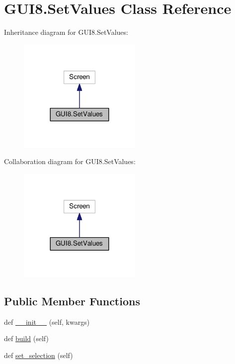 \hypertarget{classGUI8_1_1SetValues}{}\section{G\+U\+I8.\+Set\+Values Class Reference}
\label{classGUI8_1_1SetValues}


Inheritance diagram for G\+U\+I8.\+Set\+Values\+:
\nopagebreak
\begin{figure}[H]
\begin{center}
\leavevmode
\includegraphics[width=168pt]{classGUI8_1_1SetValues__inherit__graph}
\end{center}
\end{figure}


Collaboration diagram for G\+U\+I8.\+Set\+Values\+:
\nopagebreak
\begin{figure}[H]
\begin{center}
\leavevmode
\includegraphics[width=168pt]{classGUI8_1_1SetValues__coll__graph}
\end{center}
\end{figure}
\subsection*{Public Member Functions}
\begin{DoxyCompactItemize}
\item 
def \hyperlink{classGUI8_1_1SetValues_a92fd466efdfd6e4cfbd6f88f5e0eaac3}{\+\_\+\+\_\+init\+\_\+\+\_\+} (self, kwargs)
\item 
def \hyperlink{classGUI8_1_1SetValues_ace85e56d75b593276ee1277c7dd37dff}{build} (self)
\item 
def \hyperlink{classGUI8_1_1SetValues_a5d2e6a279a103c1e9a00bc3a4b4f4276}{set\+\_\+selection} (self)
\end{DoxyCompactItemize}
